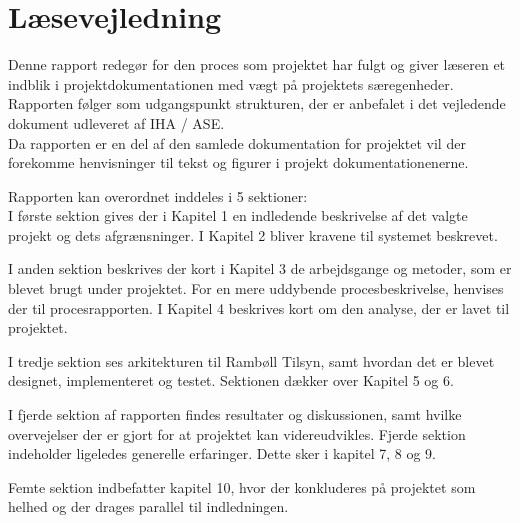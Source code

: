 \chapter*{Læsevejledning}
Denne rapport redegør for den proces som projektet har fulgt og giver læseren et indblik i projektdokumentationen med vægt på projektets særegenheder. Rapporten følger som udgangspunkt strukturen, der er anbefalet i det vejledende dokument udleveret af IHA / ASE.\\
Da rapporten er en del af den samlede dokumentation for projektet vil der forekomme
henvisninger til tekst og figurer i projekt dokumentationenerne.


Rapporten kan overordnet inddeles i 5 sektioner:\\
I første sektion gives der i Kapitel 1 en indledende beskrivelse af det valgte projekt og
dets afgrænsninger. I Kapitel 2 bliver kravene til systemet beskrevet.

I anden sektion beskrives der kort i Kapitel 3 de arbejdsgange og metoder, som er blevet brugt
under projektet. For en mere uddybende procesbeskrivelse, henvises der til procesrapporten.
I Kapitel 4 beskrives kort om den analyse, der er lavet til projektet.

I tredje sektion ses arkitekturen til Rambøll Tilsyn, samt hvordan det er blevet designet, implementeret og testet. 
Sektionen dækker over Kapitel 5 og 6.

I fjerde sektion af rapporten findes resultater og diskussionen, samt hvilke overvejelser
der er gjort for at projektet kan videreudvikles. Fjerde sektion indeholder ligeledes generelle erfaringer. 
Dette sker i kapitel 7, 8 og 9.

Femte sektion indbefatter kapitel 10, hvor der konkluderes på projektet som helhed og
der drages parallel til indledningen.

